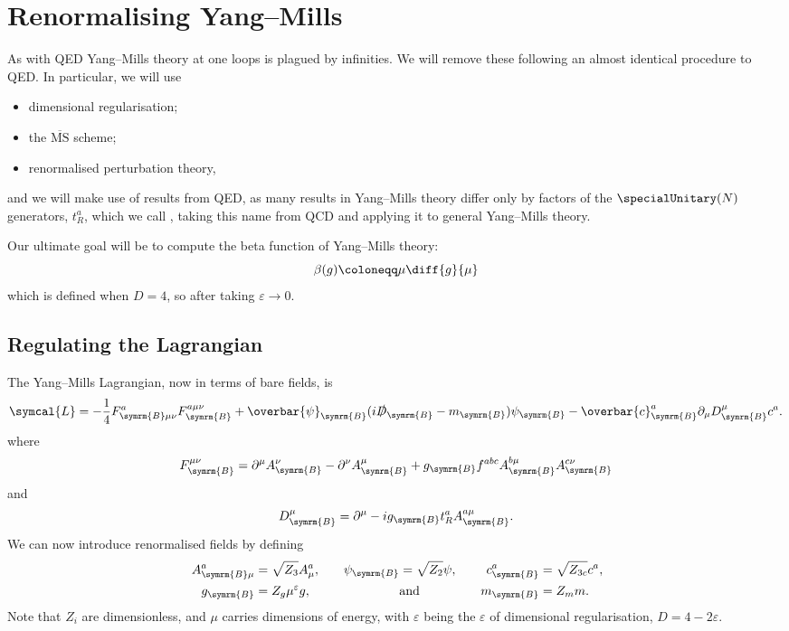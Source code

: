 \documentclass[fleqn]{NotesClass}
\newcommand{\MSbar}{\ensuremath{\overline{\text{MS}}}}
\newcommand{\diracadjoint}[1]{\overbar{#1}}
\newcommand{\covariantDerivative}{D}
\newcommand{\lagrangianDensity}{\symcal{L}}
\newcommand{\bare}{\symrm{B}}
\begin{document}
    \chapter{Renormalising Yang--Mills}
    As with QED Yang--Mills theory at one loops is plagued by infinities.
    We will remove these following an almost identical procedure to QED.
    In particular, we will use
    \begin{itemize}
        \item dimensional regularisation;
        \item the \MSbar{} scheme;
        \item renormalised perturbation theory,
    \end{itemize}
    and we will make use of results from QED, as many results in Yang--Mills theory differ only by factors of the \(\specialUnitary(N)\) generators, \(t_R^a\), which we call , taking this name from QCD and applying it to general Yang--Mills theory.
    
    Our ultimate goal will be to compute the beta function of Yang--Mills theory:
    \begin{equation}
        \beta(g) \coloneqq \mu\diff{g}{\mu}
    \end{equation}
    which is defined when \(D = 4\), so after taking \(\varepsilon \to 0\).
    
    \section{Regulating the Lagrangian}
    The Yang--Mills Lagrangian, now in terms of bare fields, is
    \begin{equation}
        \lagrangianDensity = -\frac{1}{4}F^a_{\bare\mu\nu}F^{a\mu\nu}_{\bare} + \diracadjoint{\psi}_{\bare}(i\slashed{\covariantDerivative}_{\bare} - m_{\bare})\psi_{\bare} - \diracadjoint{c}_{\bare}^a \partial_\mu \covariantDerivative_{\bare}^\mu c^a.
    \end{equation}
    where
    \begin{equation}
        F_{\bare}^{\mu\nu} = \partial^\mu A_{\bare}^\nu - \partial^\nu A_{\bare}^\mu + g_{\bare} f^{abc}A_{\bare}^{b\mu} A_{\bare}^{c\nu}
    \end{equation}
    and
    \begin{equation}
        \covariantDerivative_{\bare}^\mu = \partial^\mu - ig_{\bare} t_R^a A_{\bare}^{a\mu}.
    \end{equation}
    We can now introduce renormalised fields by defining
    \begin{align}
        A_{\bare\mu}^{a} &= \sqrt{Z_3} A^a_\mu, \quad &\psi_{\bare} &= \sqrt{Z_2} \psi, \quad& c_{\bare}^a &= \sqrt{Z_{3c}}c^a,\\
        \quad g_{\bare} &= Z_g \mu^\varepsilon g, &&\mathrm{and} & m_{\bare} &= Z_mm.
    \end{align}
    Note that \(Z_i\) are dimensionless, and \(\mu\) carries dimensions of energy, with \(\varepsilon\) being the \(\varepsilon\) of dimensional regularisation, \(D = 4 - 2\varepsilon\).
    
\end{document}
